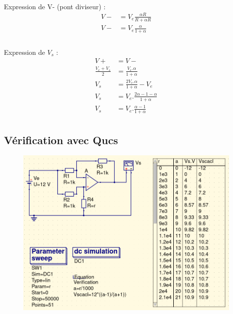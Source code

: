 \documentclass{article}
\begin{document}
\paragraph{}Expression de V- (pont diviseur) :
\begin{align*}
    V- & = V_e\frac{\alpha R}{R + \alpha R} \\
    V- & = V_e\frac{\alpha}{1 + \alpha}   \\
\end{align*}

\paragraph{}Expression de $V_s$ :
\begin{align*}
    V+                  & = V-                              \\
    \frac{V_e + V_s}{2} & = \frac{V_e.\alpha}{1 + \alpha}   \\
    V_s & = \frac{2V_e.\alpha}{1 + \alpha} - V_e            \\
    V_s & = V_e.\frac{2\alpha - 1 - \alpha}{1 + \alpha}     \\
    V_s & = V_e.\frac{\alpha - 1}{1 + \alpha}     \\
\end{align*}

\subsection{Vérification avec Qucs}

\begin{figure}[H]
    \centering
    \includegraphics[width=0.95\linewidth]{./images/AOP1-res.png}
\end{figure}
\end{document}
